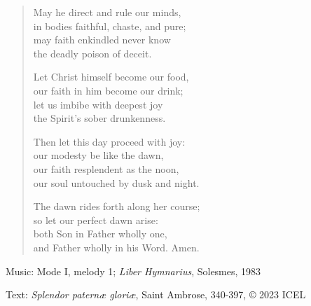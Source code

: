 \hymn



\setlength{\vleftmargin}{2em}
\begin{verse}
May he direct and rule our minds,\\
in bodies faithful, chaste, and pure;\\
may faith enkindled never know\\
the deadly poison of deceit.

Let Christ himself become our food,\\
our faith in him become our drink;\\
let us imbibe with deepest joy\\
the Spirit’s sober drunkenness.

Then let this day proceed with joy:\\
our modesty be like the dawn,\\
our faith resplendent as the noon,\\
our soul untouched by dusk and night.

The dawn rides forth along her course;\\
so let our perfect dawn arise:\\
both Son in Father wholly one,\\
and Father wholly in his Word. Amen.
\end{verse}
\setlength{\vleftmargin}{\defleftmargini}


\begin{hymnsource}
Music: Mode I, melody 1; \emph{Liber Hymnarius}, Solesmes, 1983

Text: \emph{Splendor paternæ gloriæ}, Saint Ambrose, 340-397, © 2023 ICEL
\end{hymnsource}

